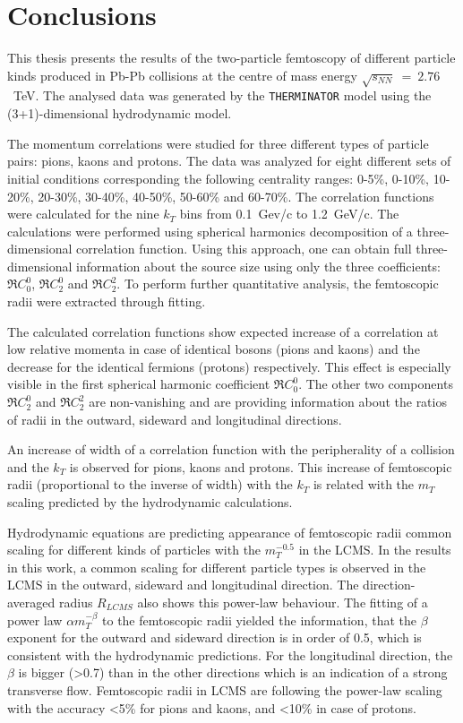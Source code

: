 \chapter*{Conclusions}
  This thesis presents the results of the two-particle femtoscopy of different particle kinds produced in Pb-Pb collisions at the centre of mass energy $\sqrt{s_{NN}}~=~2.76$~TeV.
  The analysed data was generated by the \verb|THERMINATOR| model using the (3+1)-dimensional hydrodynamic model.

  The momentum correlations were studied for three different types of particle pairs: pions, kaons and protons.
  The data was analyzed for eight different sets of initial conditions corresponding the following centrality ranges: 0-5\%, 0-10\%, 10-20\%, 20-30\%, 30-40\%, 40-50\%, 50-60\% and 60-70\%.
  The correlation functions were calculated for the nine $k_T$ bins from 0.1~Gev/c to 1.2~GeV/c.
  The calculations were performed using spherical harmonics decomposition of a three-dimensional correlation function.
  Using this approach, one can obtain full three-dimensional information about the source size using only the three coefficients: $\Re C^0_0$, $\Re C^0_2$ and $\Re C^2_2$.
  To perform further quantitative analysis, the femtoscopic radii were extracted through fitting.

  The calculated correlation functions show expected increase of a correlation at low relative momenta in case of identical bosons (pions and kaons) and the decrease for the identical fermions (protons) respectively.
  This effect is especially visible in the first spherical harmonic coefficient $\Re C^0_0$.
  The other two components $\Re C^0_2$ and $\Re C^2_2$ are non-vanishing and are providing information about the ratios of radii in the outward, sideward and longitudinal directions.

  An increase of width of a correlation function with the peripherality of a collision and the $k_T$ is observed for pions, kaons and protons.
  This increase of femtoscopic radii (proportional to the inverse of width) with the $k_T$ is related with the $m_T$ scaling predicted by the hydrodynamic calculations.

  Hydrodynamic equations are predicting appearance of femtoscopic radii common scaling for different kinds of particles with the $m_T^{-0.5}$ in the LCMS.
  In the results in this work, a common scaling for different particle types is observed in the LCMS in the outward, sideward and longitudinal direction.
  The direction-averaged radius $R_{LCMS}$ also shows this power-law behaviour.
  The fitting of a power law $\alpha m_T^{-\beta}$ to the femtoscopic radii yielded the information, that the $\beta$ exponent for the outward and sideward direction is in order of 0.5, which is consistent with the hydrodynamic predictions.
  For the longitudinal direction, the $\beta$ is bigger (>0.7) than in the other directions which is an indication of a strong transverse flow.
  Femtoscopic radii in LCMS are following the power-law scaling with the accuracy <5\% for pions and kaons, and <10\% in case of protons.
  
